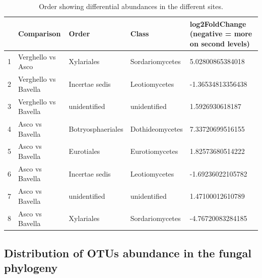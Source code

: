 \documentclass[12pt]{article}\usepackage[]{graphicx}\usepackage[]{color}
\numberwithin{figure}{section}
\begin{document}
\begin{table}[ht]
\centering
\begingroup\tiny
\begin{tabular}{lllll}
  \hline
 & Comparison & Order & Class & log2FoldChange 
 (negative = more on second levels) \\ 
  \hline
1 & Verghello vs Asco & Xylariales & Sordariomycetes & 5.02800865384018 \\ 
  2 & Verghello vs Bavella & Incertae sedis & Leotiomycetes & -1.36534813356438 \\ 
  3 & Verghello vs Bavella & unidentified & unidentified & 1.5926930618187 \\ 
  4 & Asco vs Bavella & Botryosphaeriales & Dothideomycetes & 7.33720699516155 \\ 
  5 & Asco vs Bavella & Eurotiales & Eurotiomycetes & 1.82573680514222 \\ 
  6 & Asco vs Bavella & Incertae sedis & Leotiomycetes & -1.69236022105782 \\ 
  7 & Asco vs Bavella & unidentified & unidentified & 1.47100012610789 \\ 
  8 & Asco vs Bavella & Xylariales & Sordariomycetes & -4.76720083284185 \\ 
   \hline
\end{tabular}
\endgroup
\caption{Order showing differential abundances in the different sites.} 
\end{table}



\subsection{Distribution of OTUs abundance in the fungal phylogeny}
\end{document}
